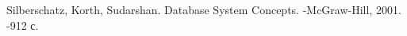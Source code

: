 \begin{thebibliography}{9}

      Silberschatz, Korth, Sudarshan.
      Database System Concepts.
      -McGraw-Hill, 2001.
      -912 с.

\end{thebibliography}
